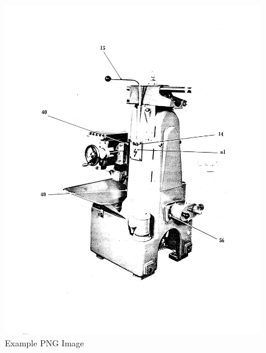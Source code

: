 \newpage
\begin{figure}[h]
    \centering
    \includegraphics[width=1.0\linewidth]{./images/page_20}
    \caption{Example PNG Image}
    \label{fig:speeds_and_feeds_controls_2}
\end{figure}
